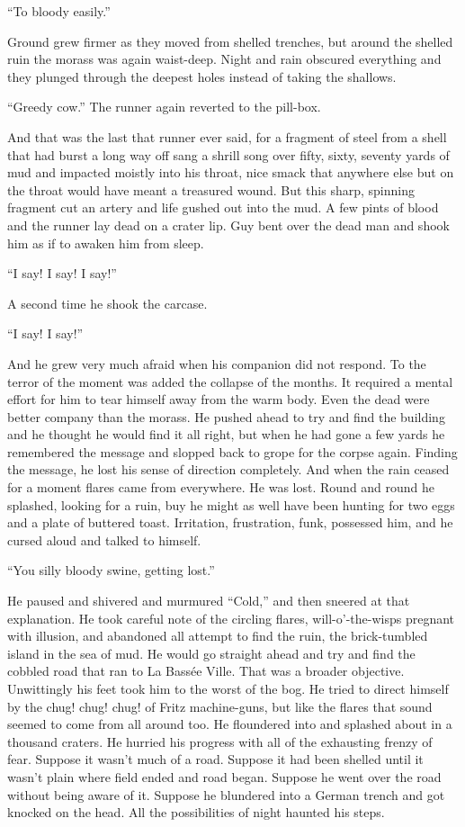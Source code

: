 ``To bloody easily.''

Ground grew firmer as they moved from shelled trenches, but around the shelled ruin the morass was again waist-deep. Night and rain obscured everything and they plunged through the deepest holes instead of taking the shallows.

``Greedy cow.'' The runner again reverted to the pill-box.

And that was the last that runner ever said, for a fragment of steel from a shell that had burst a long way off sang a shrill song over fifty, sixty, seventy yards of mud and impacted moistly into his throat, nice smack that anywhere else but on the throat would have meant a treasured wound. But this sharp, spinning fragment cut an artery and life gushed out into the mud. A few pints of blood and the runner lay dead on a crater lip. Guy bent over the dead man and shook him as if to awaken him from sleep.

``I say! I say! I say!''

A second time he shook the carcase.

``I say! I say!''

And he grew very much afraid when his companion did not respond. To the terror of the moment was added the collapse of the months. It required a mental effort for him to tear himself away from the warm body. Even the dead were better company than the morass. He pushed ahead to try and find the building and he thought he would find it all right, but when he had gone a few yards he remembered the message and slopped back to grope for the corpse again. Finding the message, he lost his sense of direction completely. And when the rain ceased for a moment flares came from everywhere. He was lost. Round and round he splashed, looking for a ruin, buy he might as well have been hunting for two eggs and a plate of buttered toast. Irritation, frustration, funk, possessed him, and he cursed aloud and talked to himself.

``You silly bloody swine, getting lost.''

He paused and shivered and murmured ``Cold,'' and then sneered at that explanation. He took careful note of the circling flares, will-o'-the-wisps pregnant with illusion, and abandoned all attempt to find the ruin, the brick-tumbled island in the sea of mud. He would go straight ahead and try and find the cobbled road that ran to La Bass\'{e}e Ville. That was a broader objective. Unwittingly his feet took him to the worst of the bog. He tried to direct himself by the chug! chug! chug! of Fritz machine-guns, but like the flares that sound seemed to come from all around too. He floundered into and splashed about in a thousand craters. He hurried his progress with all of the exhausting frenzy of fear. Suppose it wasn't much of a road. Suppose it had been shelled until it wasn't plain where field ended and road began. Suppose he went over the road without being aware of it. Suppose he blundered into a German trench and got knocked on the head. All the possibilities of night haunted his steps.

